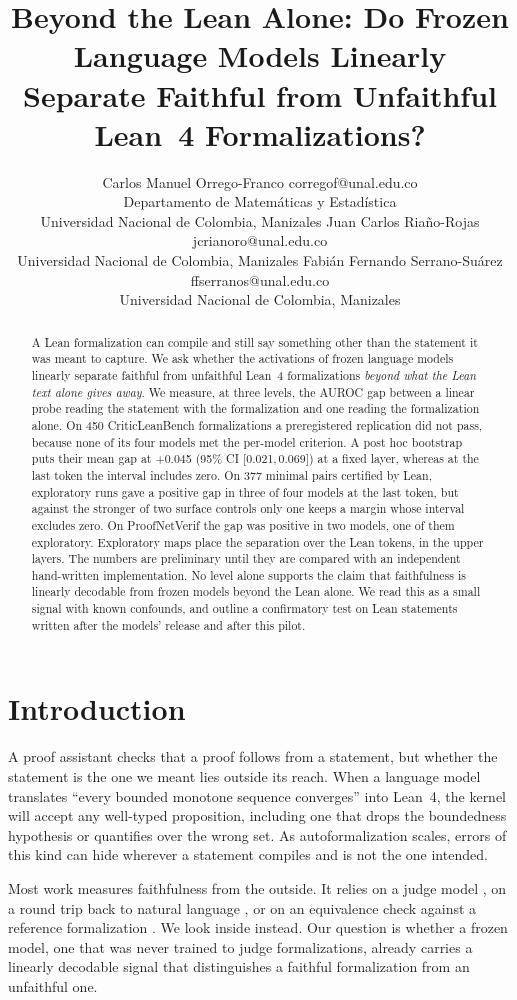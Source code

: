 \documentclass[10pt]{article}
\title{Beyond the Lean Alone: Do Frozen Language Models Linearly Separate Faithful from Unfaithful Lean~4 Formalizations?}
\author{\name Carlos Manuel Orrego-Franco \email corregof@unal.edu.co \\
      \addr Departamento de Matem\'aticas y Estad\'istica\\
      Universidad Nacional de Colombia, Manizales
      \AND
      \name Juan Carlos Ria\~no-Rojas \email jcrianoro@unal.edu.co \\
      \addr Universidad Nacional de Colombia, Manizales
      \AND
      \name Fabi\'an Fernando Serrano-Su\'arez \email ffserranos@unal.edu.co \\
      \addr Universidad Nacional de Colombia, Manizales}
\newcommand{\ic}[2]{[#1,\,#2]}
\begin{document}
\maketitle

\begin{abstract}
A Lean formalization can compile and still say something other than the statement it was meant to capture.
We ask whether the activations of frozen language models linearly separate faithful from unfaithful Lean~4
formalizations \emph{beyond what the Lean text alone gives away}. We measure, at three levels, the AUROC gap
between a linear probe reading the statement with the formalization and one reading the formalization alone.
On 450 CriticLeanBench formalizations a preregistered replication did not pass, because none of its four models
met the per-model criterion. A post hoc bootstrap puts their mean gap at +0.045 (95\% CI \ic{0.021}{0.069}) at a
fixed layer, whereas at the last token the interval includes zero.
On 377 minimal pairs certified by Lean, exploratory runs gave a positive gap in three of four models at the last
token, but against the stronger of two surface controls only one keeps a margin whose interval excludes zero.
On ProofNetVerif the gap was positive in two models, one of them exploratory.
Exploratory maps place the separation over the Lean tokens, in the upper layers.
The numbers are preliminary until they are compared with an independent hand-written implementation.
No level alone supports the claim that faithfulness is linearly decodable from frozen models beyond the Lean alone.
We read this as a small signal with known confounds, and outline a confirmatory test on Lean statements written
after the models' release and after this pilot.
\end{abstract}

\section{Introduction}

A proof assistant checks that a proof follows from a statement, but whether the statement is the one we meant lies
outside its reach. When a language model translates ``every bounded monotone sequence converges'' into Lean~4, the
kernel will accept any well-typed proposition, including one that drops the boundedness hypothesis or quantifies
over the wrong set. As autoformalization scales, errors of this kind can hide wherever a statement compiles and is
not the one intended.

Most work measures faithfulness from the outside. It relies on a judge model
\citep{criticlean,formalalign,zhang2026beyondcompilation,wang2026formalrx}, on a round trip back to natural language
\citep{amrollahi2026roundtrip}, or on an equivalence check against a reference formalization
\citep{proofnetverif,mohammad2026faithfulnessgap}. We look inside instead. Our question is whether a frozen model,
one that was never trained to judge formalizations, already carries a linearly decodable signal that distinguishes a
faithful formalization from an unfaithful one.
\end{document}
